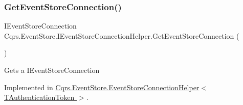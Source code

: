 \subsubsection{\texorpdfstring{Get\+Event\+Store\+Connection()}{GetEventStoreConnection()}}
{\footnotesize\ttfamily I\+Event\+Store\+Connection Cqrs.\+Event\+Store.\+I\+Event\+Store\+Connection\+Helper.\+Get\+Event\+Store\+Connection (\begin{DoxyParamCaption}{ }\end{DoxyParamCaption})}



Gets a I\+Event\+Store\+Connection 



Implemented in \hyperlink{classCqrs_1_1EventStore_1_1EventStoreConnectionHelper_a36c7ef0505319af9f8ae02da0050ab30_a36c7ef0505319af9f8ae02da0050ab30}{Cqrs.\+Event\+Store.\+Event\+Store\+Connection\+Helper$<$ T\+Authentication\+Token $>$}.

